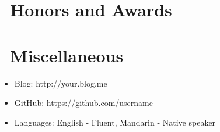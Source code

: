 \documentclass{resume}
\begin{document}
\section{\faHeartO\ Honors and Awards}

\section{\faInfo\ Miscellaneous}
\begin{itemize}[parsep=0.5ex]
  \item Blog: http://your.blog.me
  \item GitHub: https://github.com/username
  \item Languages: English - Fluent, Mandarin - Native speaker
\end{itemize}

%
%
\end{document}
